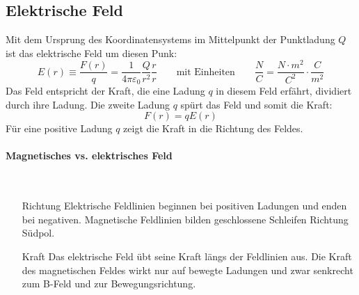 \documentclass[11pt]{article}
\begin{document}
\subsection{Elektrische Feld}

Mit dem Ursprung des Koordinatensystems im Mittelpunkt der Punktladung $Q$ ist das elektrische Feld um diesen Punk:
\begin{equation*}
	E(r) \equiv \frac{F(r)}{q} = \frac{1}{4\pi\varepsilon_0}\frac{Q}{r^2}\frac{r}{r} \qquad\text{mit Einheiten}\qquad \frac{N}{C} = \frac{N\cdot m^2}{C^2}\cdot\frac{C}{m^2}
\end{equation*}
Das Feld entspricht der Kraft, die eine Ladung $q$ in diesem Feld erf{\"a}hrt, dividiert durch ihre Ladung. \newline
Die zweite Ladung $q$ sp{\"u}rt das Feld und somit die Kraft:
\begin{equation*}
	F(r) = qE(r)
\end{equation*}
F{\"u}r eine positive Ladung $q$ zeigt die Kraft in die Richtung des Feldes.

\paragraph{Magnetisches vs. elektrisches Feld}\mbox{}\\
\begin{enumerate}
	\item[Richtung] Elektrische Feldlinien beginnen bei positiven Ladungen und enden bei negativen.\newline
		Magnetische Feldlinien bilden geschlossene Schleifen Richtung S{\"u}dpol.
	\item[Kraft] Das elektrische Feld {\"u}bt seine Kraft l{\"a}ngs der Feldlinien aus. \newline
				 Die Kraft des magnetischen Feldes wirkt nur auf bewegte Ladungen und zwar senkrecht zum B-Feld und zur Bewegungsrichtung.
\end{enumerate}
\end{document}
